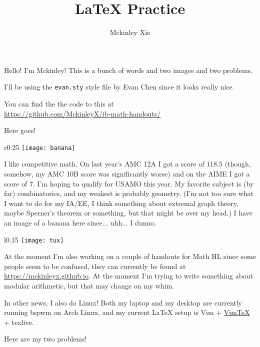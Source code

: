 \documentclass[a4paper]{scrartcl}
\author{Mckinley Xie}
\title{\LaTeX{} Practice}
\begin{document}
\maketitle

Hello! I'm Mckinley! This is a bunch of words and two images and two problems.

I'll be using the \texttt{evan.sty} style file by Evan Chen since it looks really nice.

You can find the the code to this at  \\ \url{https://github.com/MckinleyX/ib-math-handouts/}

Here goes!


\begin{wrapfigure}{r}{0.25\textwidth}
	\centering
	\texttt{[image: banana]}
\end{wrapfigure}

I like competitive math. On last year's AMC 12A I got a score of 118.5 (though, somehow, my AMC 10B score was significantly worse) and on the AIME I got a score of 7. I'm hoping to qualify for USAMO this year. My favorite subject is (by far) combinatorics, and my weakest is probably geometry. (I'm not too sure what I want to do for my IA/EE, I think something about extremal graph theory, maybe Sperner's theorem or something, but that might be over my head.) I have an image of a banana here since... uhh... I dunno.

\begin{wrapfigure}{l}{0.15\textwidth}
	\centering
	\texttt{[image: tux]}
\end{wrapfigure}
\leavevmode

At the moment I'm also working on a couple of handouts for Math HL since some people seem to be confused, they can currently be found at \url{https://mckinleyx.github.io}. At the moment I'm trying to write something about modular arithmetic, but that may change on my whim.

In other news, I also do Linux! Both my laptop and my desktop are currently running bspwm on Arch Linux, and my current \LaTeX{} setup is Vim + \href{https://github.com/lervag/vimtex}{VimTeX} + texlive. 

\newpage
Here are my two problems!
\end{document}
